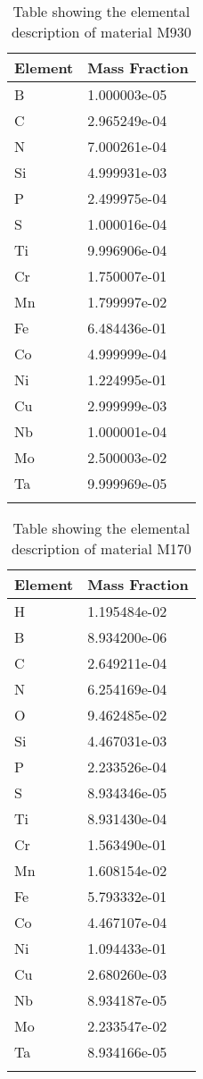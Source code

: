 \begin{centering}
\begin{longtable}[ht!]
  { p{} | p{} }
\hline
Element & Mass Fraction\\
\hline
B &  1.000003e-05\\
C &  2.965249e-04\\
N &  7.000261e-04\\
Si &  4.999931e-03\\
P &  2.499975e-04\\
S &  1.000016e-04\\
Ti &  9.996906e-04\\
Cr &  1.750007e-01\\
Mn &  1.799997e-02\\
Fe &  6.484436e-01\\
Co &  4.999999e-04\\
Ni &  1.224995e-01\\
Cu &  2.999999e-03\\
Nb &  1.000001e-04\\
Mo &  2.500003e-02\\
Ta &  9.999969e-05\\
\caption{Table showing the elemental description of material M930}
\label{table:material_UPPFW}
\end{longtable}
\clearpage

\begin{longtable}[ht!]
{ p{} | p{} }
\hline
Element & Mass Fraction\\
\hline
H &  1.195484e-02\\
B &  8.934200e-06\\
C &  2.649211e-04\\
N &  6.254169e-04\\
O &  9.462485e-02\\
Si &  4.467031e-03\\
P &  2.233526e-04\\
S &  8.934346e-05\\
Ti &  8.931430e-04\\
Cr &  1.563490e-01\\
Mn &  1.608154e-02\\
Fe &  5.793332e-01\\
Co &  4.467107e-04\\
Ni &  1.094433e-01\\
Cu &  2.680260e-03\\
Nb &  8.934187e-05\\
Mo &  2.233547e-02\\
Ta &  8.934166e-05\\
\caption{Table showing the elemental description of material M170}
\label{table:material_M170}
\end{longtable}
\clearpage


\end{centering}
